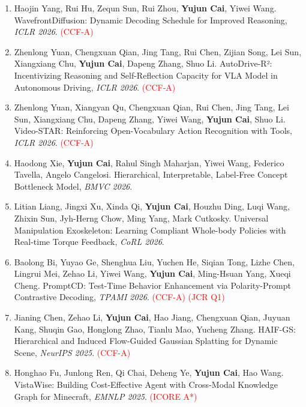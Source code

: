 \documentclass[UTF8,a4paper,11pt,fontset=fandol]{ctexart}
\begin{document}
\begin{enumerate}
\item Haojin Yang, Rui Hu, Zequn Sun, Rui Zhou, \textbf{Yujun Cai}, Yiwei Wang. WavefrontDiffusion: Dynamic Decoding Schedule for Improved Reasoning, \textit{ICLR 2026}. \textcolor{red}{(CCF-A)}

\item Zhenlong Yuan, Chengxuan Qian, Jing Tang, Rui Chen, Zijian Song, Lei Sun, Xiangxiang Chu, \textbf{Yujun Cai}, Dapeng Zhang, Shuo Li. AutoDrive-R²: Incentivizing Reasoning and Self-Reflection Capacity for VLA Model in Autonomous Driving, \textit{ICLR 2026}. \textcolor{red}{(CCF-A)}

\item Zhenlong Yuan, Xiangyan Qu, Chengxuan Qian, Rui Chen, Jing Tang, Lei Sun, Xiangxiang Chu, Dapeng Zhang, Yiwei Wang, \textbf{Yujun Cai}, Shuo Li. Video-STAR: Reinforcing Open-Vocabulary Action Recognition with Tools, \textit{ICLR 2026}. \textcolor{red}{(CCF-A)}

\item Haodong Xie, \textbf{Yujun Cai}, Rahul Singh Maharjan, Yiwei Wang, Federico Tavella, Angelo Cangelosi. Hierarchical, Interpretable, Label-Free Concept Bottleneck Model, \textit{BMVC 2026}.

\item Litian Liang, Jingxi Xu, Xinda Qi, \textbf{Yujun Cai}, Houzhu Ding, Luqi Wang, Zhixin Sun, Jyh-Herng Chow, Ming Yang, Mark Cutkosky. Universal Manipulation Exoskeleton: Learning Compliant Whole-body Policies with Real-time Torque Feedback, \textit{CoRL 2026}.

\item Baolong Bi, Yuyao Ge, Shenghua Liu, Yuchen He, Siqian Tong, Lizhe Chen, Lingrui Mei, Zehao Li, Yiwei Wang, \textbf{Yujun Cai}, Ming-Hsuan Yang, Xueqi Cheng. PromptCD: Test-Time Behavior Enhancement via Polarity-Prompt Contrastive Decoding, \textit{TPAMI 2026}. \textcolor{red}{(CCF-A)} \textcolor{red}{(JCR Q1)}

\item Jianing Chen, Zehao Li, \textbf{Yujun Cai}, Hao Jiang, Chengxuan Qian, Juyuan Kang, Shuqin Gao, Honglong Zhao, Tianlu Mao, Yucheng Zhang. HAIF-GS: Hierarchical and Induced Flow-Guided Gaussian Splatting for Dynamic Scene, \textit{NeurIPS 2025}. \textcolor{red}{(CCF-A)}

\item Honghao Fu, Junlong Ren, Qi Chai, Deheng Ye, \textbf{Yujun Cai}, Hao Wang. VistaWise: Building Cost-Effective Agent with Cross-Modal Knowledge Graph for Minecraft, \textit{EMNLP 2025}. \textcolor{red}{(ICORE A*)}


\end{enumerate}
\end{document}
